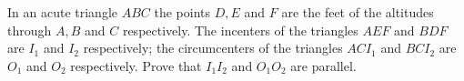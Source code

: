 In an acute triangle 
$ABC$
 the points 
$D,E$
 and 
$F$
 are the feet of the altitudes through 
$A,B$
 and 
$C$
 respectively. The incenters of the triangles 
$AEF$
 and 
$BDF$
 are 
$I_1$
 and 
$I_2$
 respectively; the circumcenters of the triangles 
$ACI_1$
 and 
$BCI_2$
 are 
$O_1$
 and 
$O_2$
 respectively. Prove that 
$I_1I_2$
 and 
$O_1O_2$
 are parallel.
